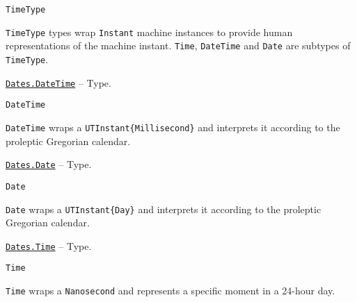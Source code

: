 \begin{adjustwidth}{2em}{0pt}


\begin{verbatim}
TimeType
\end{verbatim}

\texttt{TimeType} types wrap \texttt{Instant} machine instances to provide human representations of the machine instant. \texttt{Time}, \texttt{DateTime} and \texttt{Date} are subtypes of \texttt{TimeType}.



\end{adjustwidth}
\hypertarget{17572689933274889838}{} 
\hyperlink{17572689933274889838}{\texttt{Dates.DateTime}}  -- {Type.}

\begin{adjustwidth}{2em}{0pt}


\begin{verbatim}
DateTime
\end{verbatim}

\texttt{DateTime} wraps a \texttt{UTInstant\{Millisecond\}} and interprets it according to the proleptic Gregorian calendar.



\end{adjustwidth}
\hypertarget{4488183467971164548}{} 
\hyperlink{4488183467971164548}{\texttt{Dates.Date}}  -- {Type.}

\begin{adjustwidth}{2em}{0pt}


\begin{verbatim}
Date
\end{verbatim}

\texttt{Date} wraps a \texttt{UTInstant\{Day\}} and interprets it according to the proleptic Gregorian calendar.



\end{adjustwidth}
\hypertarget{8861990744010508981}{} 
\hyperlink{8861990744010508981}{\texttt{Dates.Time}}  -- {Type.}

\begin{adjustwidth}{2em}{0pt}


\begin{verbatim}
Time
\end{verbatim}

\texttt{Time} wraps a \texttt{Nanosecond} and represents a specific moment in a 24-hour day.



\end{adjustwidth}

